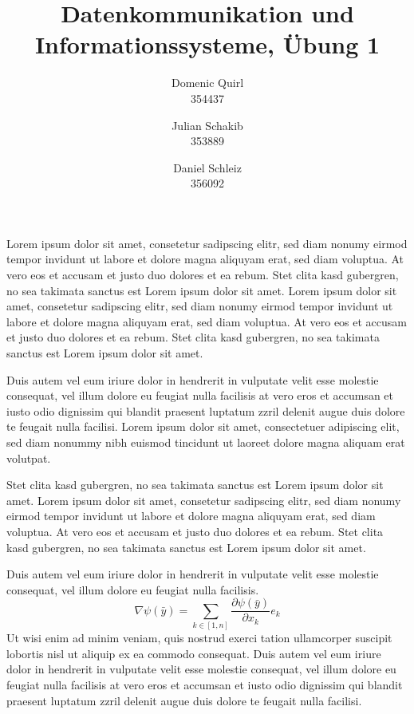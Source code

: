 \documentclass{../exercisesheet}
\title{Datenkommunikation und Informationssysteme, Übung 1}
\author{
    Domenic Quirl \\ 354437
    \and
    Julian Schakib  \\ 353889
    \and 
    Daniel Schleiz \\ 356092
}
\begin{document}
\maketitle
\pointtable

\begin{exercise}{10}
	\begin{subexercise}
		Lorem ipsum dolor sit amet, consetetur sadipscing elitr, sed diam nonumy eirmod tempor invidunt ut labore et dolore magna aliquyam erat, 
		sed diam voluptua. At vero eos et accusam et justo duo dolores et ea rebum. Stet clita kasd gubergren, no sea takimata sanctus est Lorem 
		ipsum dolor sit amet. Lorem ipsum dolor sit amet, consetetur sadipscing elitr, sed diam nonumy eirmod tempor invidunt ut labore et dolore 
		magna aliquyam erat, sed diam voluptua. At vero eos et accusam et justo duo dolores et ea rebum. Stet clita kasd gubergren, no sea takimata sanctus est Lorem ipsum dolor sit amet.
	\end{subexercise}

	\begin{subexercise}
		Duis autem vel eum iriure dolor in hendrerit in vulputate velit esse molestie consequat, vel illum dolore eu feugiat nulla facilisis 
		at vero eros et accumsan et iusto odio dignissim qui blandit praesent luptatum zzril delenit augue duis dolore te feugait nulla facilisi. 
		Lorem ipsum dolor sit amet, consectetuer adipiscing elit, sed diam nonummy nibh euismod tincidunt ut laoreet dolore magna aliquam erat volutpat.   
	\end{subexercise}

	\begin{subexercise}
		Stet clita kasd gubergren, no sea takimata sanctus est Lorem ipsum dolor sit amet. Lorem ipsum dolor sit amet, 
		consetetur sadipscing elitr, sed diam nonumy eirmod tempor invidunt ut labore et dolore magna aliquyam erat, sed diam voluptua. 
		At vero eos et accusam et justo duo dolores et ea rebum. Stet clita kasd gubergren, no sea takimata sanctus est Lorem ipsum dolor sit amet.
	\end{subexercise}
\end{exercise}


\begin{exercise}{12}
	\begin{subexercise}
		Duis autem vel eum iriure dolor in hendrerit in vulputate velit esse molestie consequat, vel illum dolore eu feugiat nulla facilisis.
		$$ \nabla \psi(\bar y) = \sum_{k \in [1,n]} \frac{\partial\psi(\bar y)}{\partial x_k}e_k$$
		Ut wisi enim ad minim veniam, quis nostrud exerci tation ullamcorper suscipit lobortis nisl ut aliquip ex ea commodo consequat. 
		Duis autem vel eum iriure dolor in hendrerit in vulputate velit esse molestie consequat, vel illum dolore eu feugiat nulla facilisis at 
		vero eros et accumsan et iusto odio dignissim qui blandit praesent luptatum zzril delenit augue duis dolore te feugait nulla facilisi.
	\end{subexercise}
\end{exercise}
\end{document}
